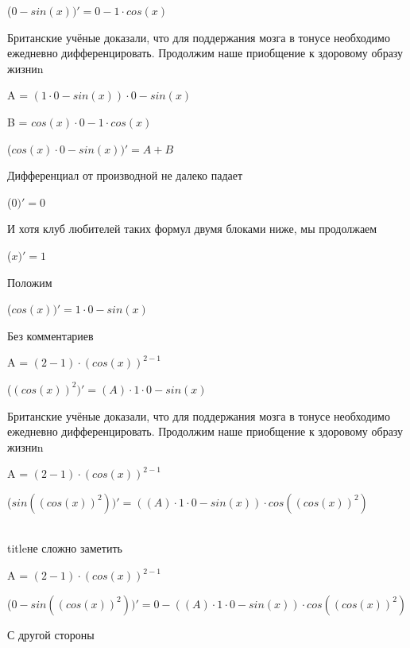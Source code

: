 \documentclass[12pt,a4paper,fleqn]{article}
\begin{document}
\begin{center}
 ($0-sin(x))'
  = 0-1 \cdot cos(x)$\end{center}
Британские учёные доказали, что для поддержания мозга в тонусе необходимо ежедневно дифференцировать. Продолжим наше приобщение к здоровому образу жизниn

\begin{center}
A = $(1 \cdot 0-sin(x)) \cdot 0-sin(x)$\end{center}
\begin{center}
B = $cos(x) \cdot 0-1 \cdot cos(x)$\end{center}
\begin{center}
 ($cos(x) \cdot 0-sin(x))'
  = A+B$\end{center}
Дифференциал от производной не далеко падает\cite{link2}

\begin{center}
 ($0)'
  = 0$\end{center}
И хотя клуб любителей таких формул двумя блоками ниже, мы продолжаем

\begin{center}
 ($x)'
  = 1$\end{center}
Положим

\begin{center}
 ($cos(x))'
  = 1 \cdot 0-sin(x)$\end{center}
Без комментариев\cite{link4}

\begin{center}
A = $(2-1) \cdot (cos(x))^{2-1}$\end{center}
\begin{center}
 ($(cos(x))^{2})'
  = (A) \cdot 1 \cdot 0-sin(x)$\end{center}
Британские учёные доказали, что для поддержания мозга в тонусе необходимо ежедневно дифференцировать. Продолжим наше приобщение к здоровому образу жизниn

\begin{center}
A = $(2-1) \cdot (cos(x))^{2-1}$\end{center}
\begin{center}
 ($sin((cos(x))^{2}))'
  = ((A) \cdot 1 \cdot 0-sin(x)) \cdot cos((cos(x))^{2})$\end{center}
\\ title{не сложно заметить} 

\begin{center}
A = $(2-1) \cdot (cos(x))^{2-1}$\end{center}
\begin{center}
 ($0-sin((cos(x))^{2}))'
  = 0-((A) \cdot 1 \cdot 0-sin(x)) \cdot cos((cos(x))^{2})$\end{center}
С другой стороны
\end{document}
